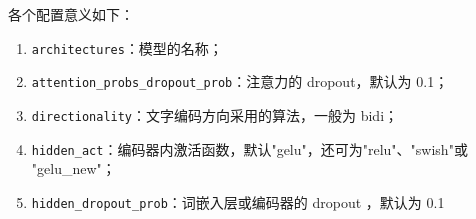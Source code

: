 各个配置意义如下：
\begin{enumerate}
\item \verb`architectures`：模型的名称；
\item \verb`attention_probs_dropout_prob`：注意力的 dropout，默认为 0.1；
\item \verb`directionality`：文字编码方向采用的算法，一般为 bidi；
\item \verb`hidden_act`：编码器内激活函数，默认"gelu"，还可为"relu"、"swish"或 "gelu_new"；
\item \verb`hidden_dropout_prob`：词嵌入层或编码器的 dropout ，默认为 0.1
\end{enumerate}